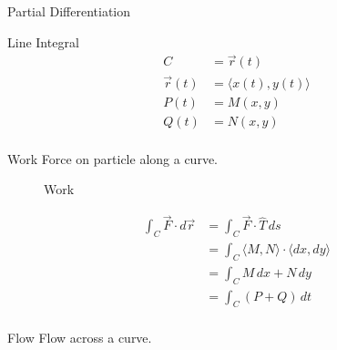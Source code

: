 \begin{section}{Partial Differentiation}
  \begin{section}{Line Integral}
    \begin{align*}
      C &=\vec{r}(t) \\
      \vec{r}(t) &=\langle x(t),y(t) \rangle  \\
      P(t) &= M(x,y) \\
      Q(t) &= N(x,y) \\
    \end{align*}
    \begin{subsection}{Work}
      Force on particle along a curve.
      \begin{figure}[h!]
        \begin{center}
          \caption{Work}
        \end{center}
      \end{figure}
      \begin{align*}
        \int_C \vec{F} \cdot d\vec{r} &= \int_C \vec{F} \cdot \hat{T} \, ds \\
                                      &= \int_C \langle M,N \rangle \cdot \langle dx,dy \rangle \\
                                      &= \int_C M\,dx + N\,dy \\
                                      &= \int_C (P + Q) \,dt \\
      \end{align*}
      \FloatBarrier
    \end{subsection} %
    \begin{subsection}{Flow}
      Flow across a curve.
      \begin{figure}[h!]
        \begin{center}

\end{center}
\end{figure}
\end{subsection}
\end{section}
\end{section}
